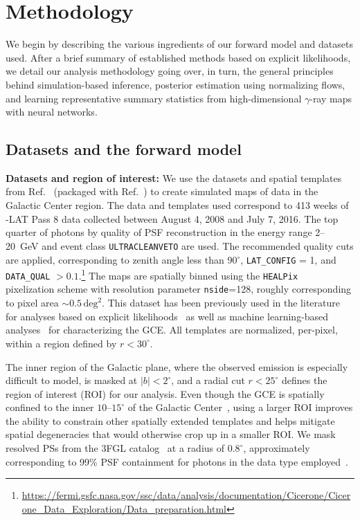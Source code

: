 \documentclass[prd,aps,10pt,nofootinbib,twocolumn,superscriptaddress,preprintnumbers,balancelastpage,longbibliography]{revtex4-1}
\begin{document}
\section{Methodology}
\label{sec:analysis}

We begin by describing the various ingredients of our forward model and datasets used. After a brief summary of established methods based on explicit likelihoods, we detail our analysis methodology going over, in turn, the general principles behind simulation-based inference, posterior estimation using normalizing flows, and learning representative summary statistics from high-dimensional $\gamma$-ray maps with neural networks.

\subsection{Datasets and the forward model}
\label{sec:datasets}

\noindent
\textbf{Datasets and region of interest:} We use the datasets and spatial templates from Ref.~\cite{rodd_nicholas_safdi_siddharth_2016} (packaged with Ref.~\cite{Mishra-Sharma:2016gis}) to create simulated maps of \Fermi data in the Galactic Center region. The data and templates used correspond to 413 weeks of \Fermi-LAT Pass 8 data collected between August 4, 2008 and July 7, 2016. The top quarter of photons by quality of PSF reconstruction in the energy range 2--20~GeV and event class \texttt{ULTRACLEANVETO} are used. The recommended quality cuts are applied, corresponding to zenith angle less than 90$^\circ$, \texttt{LAT\_CONFIG} = 1, and \texttt{DATA\_QUAL} $> 0.1$.\footnote{\url{https://fermi.gsfc.nasa.gov/ssc/data/analysis/documentation/Cicerone/Cicerone_Data_Exploration/Data_preparation.html}} The maps are spatially binned using the \texttt{HEALPix}~\cite{Gorski:2004by} pixelization scheme with resolution parameter \texttt{nside}=128, roughly corresponding to pixel area $\sim 0.5\,\mathrm{deg}^2$. This dataset has been previously used in the literature for analyses based on explicit likelihoods~\cite{Buschmann:2020adf,Chang:2019ars,Leane:2019xiy} as well as machine learning-based analyses~\cite{List:2020mzd} for characterizing the GCE. All templates are normalized, per-pixel, within a region defined by $r < 30^\circ$.

The inner region of the Galactic plane, where the observed emission is especially difficult to model, is masked at $|b| < 2^\circ$, and a radial cut $r < 25^\circ$ defines the region of interest (ROI) for our analysis. Even though the GCE is spatially confined to the inner $10\mbox{--}15^\circ$ of the Galactic Center~\cite{Daylan:2014rsa,Calore:2014xka}, using a larger ROI improves the ability to constrain other spatially extended templates and helps mitigate spatial degeneracies that would otherwise crop up in a smaller ROI. We mask resolved PSs from the 3FGL catalog~\cite{Fermi-LAT:2015bhf} at a radius of $0.8^\circ$, approximately corresponding to 99\% PSF containment for photons in the data type employed~\cite{Fermi-LAT:2015bhf}. \\
\end{document}
